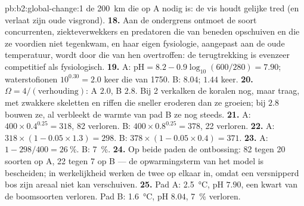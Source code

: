 \begin{solution}{pb:b2:global-change:1}
de \qty{200}{km} die op A nodig is: de vis houdt gelijke tred (en verlaat
zijn oude visgrond).
\textbf{18.} Aan de ondergrens ontmoet de soort concurrenten,
ziekteverwekkers en predatoren die van beneden opschuiven en die ze voordien
niet tegenkwam, en haar eigen fysiologie, aangepast aan de oude temperatuur,
wordt door die van hen overtroffen: de terugtrekking is evenzeer competitief als
fysiologisch.
\textbf{19.} A: $\mathrm{pH} = 8.2 - 0.9\log_{10}(600/280) = 7.90$;
waterstofionen $10^{0.30} = 2.0$ keer die van 1750. B: $8.04$; $1.44$
keer.
\textbf{20.} $\Omega = 4/(\text{verhouding})$: A $2.0$, B $2.8$. Bij 2
verkalken de koralen nog, maar traag, met zwakkere skeletten en riffen die
sneller eroderen dan ze groeien; bij $2.8$ bouwen ze, al verbleekt de warmte
van pad B ze nog steeds.
\textbf{21.} A: $400\times 0.4^{0.25} = 318$, 82 verloren. B:
$400\times 0.8^{0.25} = 378$, 22 verloren.
\textbf{22.} A: $318\times(1 - 0.05\times 1.3) = 298$. B:
$378\times(1 - 0.05\times 0.4) = 371$.
\textbf{23.} A: $1 - 298/400 = \qty{26}{\%}$. B: \qty{7}{\%}.
\textbf{24.} Op beide paden de ontbossing: 82 tegen 20 soorten op A, 22
tegen 7 op B --- de opwarmingsterm van het model is bescheiden; in werkelijkheid
werken de twee op elkaar in, omdat een versnipperd bos zijn areaal niet kan
verschuiven.
\textbf{25.} Pad A: \qty{2.5}{\celsius}, pH $7.90$, een kwart van de
boomsoorten verloren. Pad B: \qty{1.6}{\celsius}, pH $8.04$, \qty{7}{\%}
verloren.
\end{solution}
